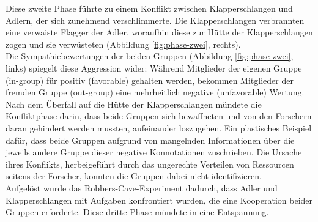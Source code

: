 Diese zweite Phase führte zu einem Konflikt zwischen Klapperschlangen und Adlern, der sich zunehmend verschlimmerte. Die Klapperschlangen verbrannten eine verwaiste Flagger der Adler, woraufhin diese zur Hütte der Klapperschlangen zogen und sie verwüsteten (Abbildung \ref{fig:phase-zwei}, rechts). \\

Die Sympathiebewertungen der beiden Gruppen (Abbildung \ref{fig:phase-zwei}, links) spiegelt diese Aggression wider: Während Mitglieder der eigenen Gruppe (in-group) für positiv (favorable) gehalten werden, bekommen Mitglieder der fremden Gruppe (out-group) eine mehrheitlich negative (unfavorable) Wertung. \\ 

Nach dem Überfall auf die Hütte der Klapperschlangen mündete die Konfliktphase darin, dass beide Gruppen sich bewaffneten und von den Forschern daran gehindert werden mussten, aufeinander loszugehen. Ein plastisches Beispiel dafür, dass beide Gruppen aufgrund von mangelnden Informationen über die jeweils andere Gruppe dieser negative Konnotationen zuschrieben. Die Ursache ihres Konflikts, herbeigeführt durch das ungerechte Verteilen von Ressourcen seitens der Forscher, konnten die Gruppen dabei nicht identifizieren. \\

Aufgelöst wurde das Robbers-Cave-Experiment dadurch, dass Adler und Klapperschlangen mit Aufgaben konfrontiert wurden, die eine Kooperation beider Gruppen erforderte. Diese dritte Phase mündete in eine Entspannung. \\


